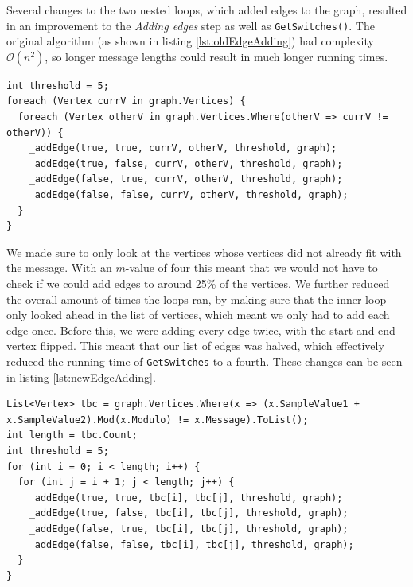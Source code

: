 Several changes to the two nested loops, which added edges to the graph, resulted in an improvement to the \textit{Adding edges} step as well as \lstinline|GetSwitches()|.
The original algorithm (as shown in listing \ref{lst:oldEdgeAdding}) had complexity $\mathcal{O}(n^2)$, so longer message lengths could result in much longer running times.

\begin{lstlisting}[firstnumber=459,label=lst:oldEdgeAdding, caption={Original algorithm for adding edges to the graph.
\textbf{File:} first\textunderscore  round/CS/JPEGImage.cs.}]
int threshold = 5;
foreach (Vertex currV in graph.Vertices) {
  foreach (Vertex otherV in graph.Vertices.Where(otherV => currV != otherV)) {
    _addEdge(true, true, currV, otherV, threshold, graph);
    _addEdge(true, false, currV, otherV, threshold, graph);
    _addEdge(false, true, currV, otherV, threshold, graph);
    _addEdge(false, false, currV, otherV, threshold, graph);
  }
}
\end{lstlisting}

We made sure to only look at the vertices whose vertices did not already fit with the message.
With an $m$-value of four this meant that we would not have to check if we could add edges to around 25\% of the vertices.
We further reduced the overall amount of times the loops ran, by making sure that the inner loop only looked ahead in the list of vertices, which meant we only had to add each edge once.
Before this, we were adding every edge twice, with the start and end vertex flipped.
This meant that our list of edges was halved, which effectively reduced the running time of \lstinline|GetSwitches| to a fourth.
These changes can be seen in listing \ref{lst:newEdgeAdding}.

\begin{lstlisting}[firstnumber=449,label=lst:newEdgeAdding, caption={Improved algorithm for adding edges to the graph.
\textbf{File:} second\textunderscore  round/CS/JPEGImage.cs.}]
List<Vertex> tbc = graph.Vertices.Where(x => (x.SampleValue1 + x.SampleValue2).Mod(x.Modulo) != x.Message).ToList();
int length = tbc.Count;
int threshold = 5;
for (int i = 0; i < length; i++) {
  for (int j = i + 1; j < length; j++) {
    _addEdge(true, true, tbc[i], tbc[j], threshold, graph);
    _addEdge(true, false, tbc[i], tbc[j], threshold, graph);
    _addEdge(false, true, tbc[i], tbc[j], threshold, graph);
    _addEdge(false, false, tbc[i], tbc[j], threshold, graph);
  }
}
\end{lstlisting}

